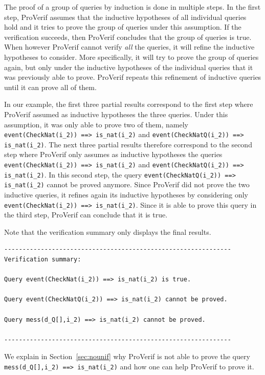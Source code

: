 \documentclass{book}
\begin{document}
The proof of a group of queries by induction is done in multiple steps. In the first step, ProVerif assumes that the inductive hypotheses of all individual queries hold and it tries to prove the group of queries under this assumption. If the verification succeeds, then ProVerif concludes that the group of queries is true. When however ProVerif cannot verify \emph{all} the queries, it will refine the inductive hypotheses to consider. More specifically, it will try to prove the group of queries again, but only under the inductive hypotheses of the individual queries that it was previously able to prove. ProVerif repeats this refinement of inductive queries until it can prove all of them.

In our example, the first three partial results correspond to the first step where ProVerif assumed as inductive hypotheses the three queries. Under this assumption, it was only able to prove two of them, namely \lstinline!event(CheckNat(i_2)) ==> is_nat(i_2)! and \lstinline!event(CheckNatQ(i_2)) ==> is_nat(i_2)!. The next three partial results therefore correspond to the second step where ProVerif only assumes as inductive hypotheses the queries \lstinline!event(CheckNat(i_2)) ==> is_nat(i_2)! and \lstinline!event(CheckNatQ(i_2)) ==> is_nat(i_2)!. In this second step, the query \lstinline!event(CheckNatQ(i_2)) ==> is_nat(i_2)! cannot be proved anymore. Since ProVerif did not prove the two inductive queries, it refines again its inductive hypotheses by considering only \lstinline!event(CheckNat(i_2)) ==> is_nat(i_2)!. Since it is able to prove this query in the third step, ProVerif can conclude that it is true.

Note that the verification summary only displays the final results.
\begin{lstlisting}[numbers=none]
--------------------------------------------------------------
Verification summary:

Query event(CheckNat(i_2)) ==> is_nat(i_2) is true.

Query event(CheckNatQ(i_2)) ==> is_nat(i_2) cannot be proved.

Query mess(d_Q[],i_2) ==> is_nat(i_2) cannot be proved.

--------------------------------------------------------------
\end{lstlisting}

We explain in Section~\ref{sec:nounif} why ProVerif is not able to prove the query \lstinline!mess(d_Q[],i_2) ==> is_nat(i_2)! and how one can help ProVerif to prove it.
\end{document}
